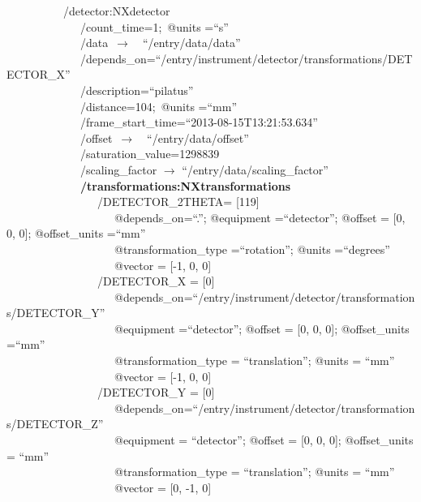 \documentclass[11pt]{a0poster}
\begin{document}
\begin{minipage}[]{0.29\linewidth}
\-\ ~~~~~~~~~/detector:NXdetector\\
\-\ ~~~~~~~~~~~~/count\_time=1;~@units =``s''\\
\-\ ~~~~~~~~~~~~/data~$\rightarrow$~~``/entry/data/data''\\
\-\ ~~~~~~~~~~~~/depends\_on=``/entry/instrument/detector/transformations/DETECTOR\_X''\\
\-\ ~~~~~~~~~~~~/description=``pilatus''\\
\-\ ~~~~~~~~~~~~/distance=104;~@units =``mm''\\
\-\ ~~~~~~~~~~~~/frame\_start\_time=``2013-08-15T13:21:53.634''\\
\-\ ~~~~~~~~~~~~/offset~$\rightarrow$~~``/entry/data/offset''\\
\-\ ~~~~~~~~~~~~/saturation\_value=1298839\\
\-\ ~~~~~~~~~~~~/scaling\_factor $\rightarrow$  ``/entry/data/scaling\_factor''\\
\-\ ~~~~~~~~~~~~{\bf /transformations:NXtransformations}\\
\-\ ~~~~~~~~~~~~~~~/DETECTOR\_2THETA= [119]\\
\-\ ~~~~~~~~~~~~~~~~~~@depends\_on=``.''; @equipment =``detector''; @offset = [0, 0, 0]; @offset\_units =``mm''\\
\-\ ~~~~~~~~~~~~~~~~~~@transformation\_type =``rotation''; @units =``degrees''\\
\-\ ~~~~~~~~~~~~~~~~~~@vector = [-1, 0, 0]\\
\-\ ~~~~~~~~~~~~~~~/DETECTOR\_X = [0]\\
\-\ ~~~~~~~~~~~~~~~~~~@depends\_on=``/entry/instrument/detector/transformations/DETECTOR\_Y''\\
\-\ ~~~~~~~~~~~~~~~~~~@equipment =``detector''; @offset = [0, 0, 0]; @offset\_units =``mm''\\
\-\ ~~~~~~~~~~~~~~~~~~@transformation\_type  = ``translation''; @units = ``mm''\\
\-\ ~~~~~~~~~~~~~~~~~~@vector  = [-1, 0, 0]\\
\-\ ~~~~~~~~~~~~~~~/DETECTOR\_Y = [0]\\
\-\ ~~~~~~~~~~~~~~~~~~@depends\_on=``/entry/instrument/detector/transformations/DETECTOR\_Z''\\
\-\ ~~~~~~~~~~~~~~~~~~@equipment  = ``detector''; @offset  = [0, 0, 0]; @offset\_units  = ``mm''\\
\-\ ~~~~~~~~~~~~~~~~~~@transformation\_type  = ``translation''; @units = ``mm''\\
\-\ ~~~~~~~~~~~~~~~~~~@vector = [0, -1, 0]\\

\end{minipage}
\end{document}
